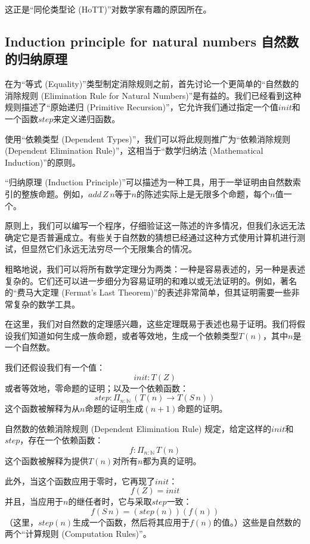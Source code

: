 \documentclass[DaoFP]{subfiles}
\begin{document}
 这正是“同伦类型论 (HoTT)”对数学家有趣的原因所在。

 \subsection{Induction principle for natural numbers 自然数的归纳原理}

 在为“等式 (Equality)”类型制定消除规则之前，首先讨论一个更简单的“自然数的消除规则 (Elimination Rule for Natural Numbers)”是有益的。我们已经看到这种规则描述了“原始递归 (Primitive Recursion)”，它允许我们通过指定一个值$\mathit{init}$和一个函数$\mathit{step}$来定义递归函数。

 使用“依赖类型 (Dependent Types)”，我们可以将此规则推广为“依赖消除规则 (Dependent Elimination Rule)”，这相当于“数学归纳法 (Mathematical Induction)”的原则。

 “归纳原理 (Induction Principle)”可以描述为一种工具，用于一举证明由自然数索引的整族命题。例如，$add\,Z\,n$等于$n$的陈述实际上是无限多个命题，每个$n$值一个。

 原则上，我们可以编写一个程序，仔细验证这一陈述的许多情况，但我们永远无法确定它是否普遍成立。有些关于自然数的猜想已经通过这种方式使用计算机进行测试，但显然它们永远无法穷尽一个无限集合的情况。

 粗略地说，我们可以将所有数学定理分为两类：一种是容易表述的，另一种是表述复杂的。它们还可以进一步细分为容易证明的和难以或无法证明的。例如，著名的“费马大定理 (Fermat's Last Theorem)”的表述非常简单，但其证明需要一些非常复杂的数学工具。

 在这里，我们对自然数的定理感兴趣，这些定理既易于表述也易于证明。我们将假设我们知道如何生成一族命题，或者等效地，生成一个依赖类型$T(n)$，其中$n$是一个自然数。

 我们还假设我们有一个值：
 \[\mathit{init} \colon T(Z) \]
 或者等效地，零命题的证明；以及一个依赖函数：
 \[\mathit{step} \colon \Pi_{n:\mathbb{N}}\,\left(T(n) \to T(S\,n)\right) \]
 这个函数被解释为从$n$命题的证明生成$(n + 1)$命题的证明。

 自然数的依赖消除规则 (Dependent Elimination Rule) 规定，给定这样的$\mathit{init}$和$\mathit{step}$，存在一个依赖函数：
 \[f \colon \Pi_{n:\mathbb{N}} \, T(n) \]
 这个函数被解释为提供$T(n)$对所有$n$都为真的证明。

 此外，当这个函数应用于零时，它再现了$\mathit{init}$：
 \[ f (Z) = \mathit{init} \]
 并且，当应用于$n$的继任者时，它与采取$\mathit{step}$一致：
 \[ f (S\,n) = (\mathit{step} (n)) (f (n)) \]
 （这里，$\mathit{step}(n)$生成一个函数，然后将其应用于$f(n)$的值。）这些是自然数的两个“计算规则 (Computation Rules)”。
\end{document}
